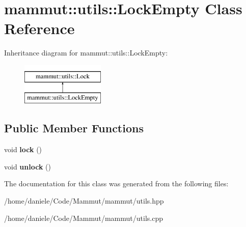 \hypertarget{classmammut_1_1utils_1_1LockEmpty}{\section{mammut\-:\-:utils\-:\-:Lock\-Empty Class Reference}
\label{classmammut_1_1utils_1_1LockEmpty}
}
Inheritance diagram for mammut\-:\-:utils\-:\-:Lock\-Empty\-:\begin{figure}[H]
\begin{center}
\leavevmode
\includegraphics[height=2.000000cm]{classmammut_1_1utils_1_1LockEmpty}
\end{center}
\end{figure}
\subsection*{Public Member Functions}
\begin{DoxyCompactItemize}
\item 
\hypertarget{classmammut_1_1utils_1_1LockEmpty_aa91e955cd6891b5e7301b05e67eef031}{void {\bfseries lock} ()}\label{classmammut_1_1utils_1_1LockEmpty_aa91e955cd6891b5e7301b05e67eef031}

\item 
\hypertarget{classmammut_1_1utils_1_1LockEmpty_a798c17ef0a05e2d4cf70aa193fba93db}{void {\bfseries unlock} ()}\label{classmammut_1_1utils_1_1LockEmpty_a798c17ef0a05e2d4cf70aa193fba93db}

\end{DoxyCompactItemize}


The documentation for this class was generated from the following files\-:\begin{DoxyCompactItemize}
\item 
/home/daniele/\-Code/\-Mammut/mammut/utils.\-hpp\item 
/home/daniele/\-Code/\-Mammut/mammut/utils.\-cpp\end{DoxyCompactItemize}
